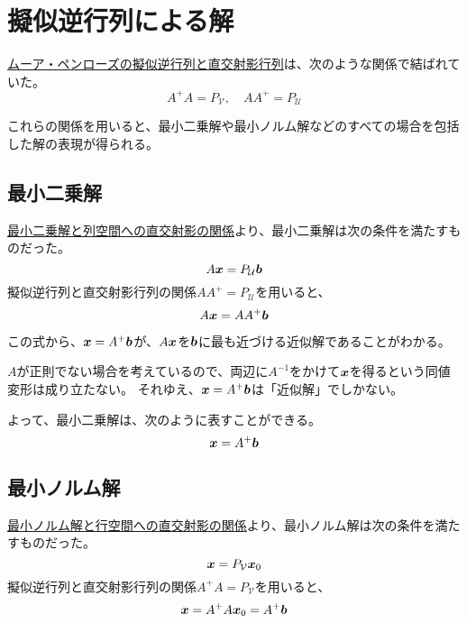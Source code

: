 \documentclass[../../../topic_linear-algebra]{subfiles}
\begin{document}
\sectionline
\section{擬似逆行列による解}

\hyperref[sec:pseudoinverse-projection]{ムーア・ペンローズの擬似逆行列と直交射影行列}は、次のような関係で結ばれていた。
\begin{equation*}
  A^+ A = P_{\mathcal{V}}, \quad A A^+ = P_{\mathcal{U}}
\end{equation*}

これらの関係を用いると、最小二乗解や最小ノルム解などのすべての場合を包括した解の表現が得られる。

\subsection{最小二乗解}

\hyperref[thm:least-squares-projection]{最小二乗解と列空間への直交射影の関係}より、最小二乗解は次の条件を満たすものだった。
\begin{equation*}
  A \vb*{x} = P_{\mathcal{U}} \vb*{b}
\end{equation*}
擬似逆行列と直交射影行列の関係$AA^+ = P_{\mathcal{U}}$を用いると、
\begin{equation*}
  A \vb*{x} = A A^+ \vb*{b}
\end{equation*}

この式から、$\vb*{x}=A^+ \vb*{b}$が、$A\vb*{x}$を$\vb*{b}$に最も近づける近似解であることがわかる。

\begin{supplnote}
  $A$が正則でない場合を考えているので、両辺に$A^{-1}$をかけて$\vb*{x}$を得るという同値変形は成り立たない。
  それゆえ、$\vb*{x} = A^+ \vb*{b}$は「近似解」でしかない。
\end{supplnote}

よって、最小二乗解は、次のように表すことができる。
\begin{equation*}
  \vb*{x} = A^+ \vb*{b}
\end{equation*}

\subsection{最小ノルム解}

\hyperref[thm:min-norm-solution-projection]{最小ノルム解と行空間への直交射影の関係}より、最小ノルム解は次の条件を満たすものだった。
\begin{equation*}
  \vb*{x} = P_{\mathcal{V}} \vb*{x}_0
\end{equation*}
擬似逆行列と直交射影行列の関係$A^+ A = P_{\mathcal{V}}$を用いると、
\begin{equation*}
  \vb*{x} = A^+ A \vb*{x}_0 = A^+ \vb*{b}
\end{equation*}
\end{document}
